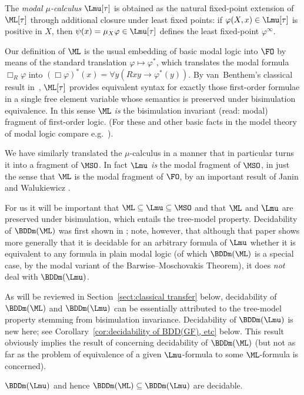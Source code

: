 \documentclass{LMCS}
\begin{document}
The \emph{modal $\mu$-calculus} $\Lmu[\tau]$ is obtained as the natural
fixed-point extension of $\ML[\tau]$ through additional closure
under least fixed points\?: if $\varphi(X,x) \in \Lmu[\tau]$ is
positive in $X$, then $\psi(x) = \mu_X \varphi \in \Lmu[\tau]$
defines the least fixed-point $\varphi^\infty$.

\medskip
Our definition of $\ML$ is the usual embedding of basic
modal logic into $\FO$ by means of
the standard translation $\varphi \mapsto \varphi^*$,
which translates the modal
formula $\Box_R \varphi$ into
$(\Box\varphi)^* (x) = \forall y ( Rxy \to \varphi^*(y))$.
By van~Benthem's classical result in~\cite{Ben83},
$\ML[\tau]$ provides equivalent syntax for exactly those first-order
formulae in a single
free element variable whose semantics is preserved under bisimulation
equivalence. In this sense $\ML$
\emph{is} the bisimulation invariant (read\?: modal)
fragment of first-order logic. (For these and other basic facts
in the model theory of modal logic compare e.g.~\cite{GOHBML2007}).

We have similarly translated the $\mu$-calculus
in a manner that in particular turns it into a fragment of $\MSO$. In fact
$\Lmu$ \emph{is} the modal fragment of $\MSO$, in just the sense that
$\ML$ is the modal fragment of $\FO$, by an important result
of Janin and Walukiewicz \cite{JaninWalukiewicz}.

For us it will be important that $\ML \subseteq \Lmu \subseteq \MSO$ and that
$\ML$ and $\Lmu$ are preserved under bisimulation, which entails the
tree-model property.
Decidability of $\BDDm(\ML)$ was first shown in \cite{Otto99}\?;
note, however, that although that paper shows more generally that
it is decidable for an arbitrary formula of $\Lmu$ whether it is
equivalent to any formula in plain modal logic (of which
$\BDDm(\ML)$ is a special case, by the modal variant of the
Barwise--Moschovakis Theorem), it does \emph{not} deal with $\BDDm(\Lmu)$.

As will be reviewed in Section~\ref{sect:classical transfer} below,
decidability of
$\BDDm(\ML)$ and $\BDDm(\Lmu)$ can be essentially attributed to the tree-model
property stemming from bisimulation invariance.
Decidability of $\BDDm(\Lmu)$ is new here\?;
see Corollary~\ref{cor:decidability of BDD(GF), etc} below.
This result obviously implies the result of \cite{Otto99}
concerning decidability of $\BDDm(\ML)$ (but not as far as the problem
of equivalence of a given $\Lmu$-formula to some $\ML$-formula is concerned).

\begin{thm}
$\BDDm(\Lmu)$ and hence $\BDDm(\ML) \subseteq \BDDm(\Lmu)$ are decidable.
\end{thm}
\end{document}
